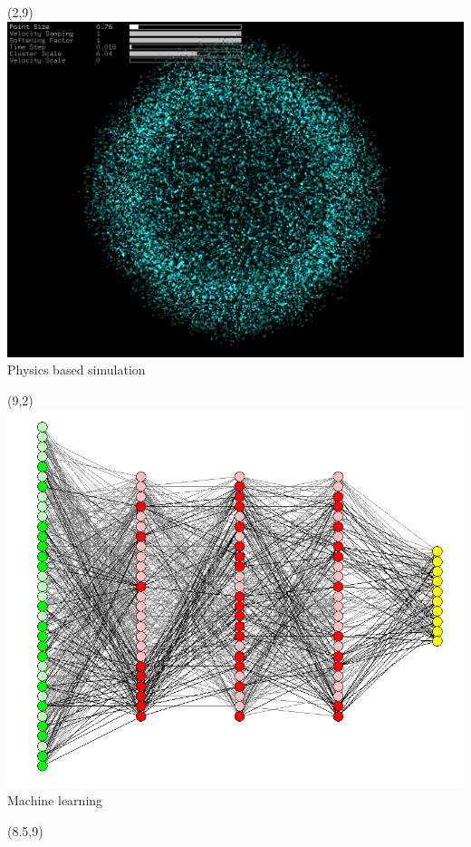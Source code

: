\documentclass{beamer}
\begin{document}
\begin{frame}
\begin{textblock}{5}(2,9)
  \centering
  \includegraphics[width=\textwidth]{graphics/opencl_nbody}
   \\
  Physics based simulation
\end{textblock}
\begin{textblock}{5}(9,2)
  \centering
\includegraphics[width=\textwidth]{graphics/neuralnet}
 \\
 \vspace{-3.5mm}
 Machine learning
\end{textblock}
\begin{textblock}{6}(8.5,9)
  \centering

\end{textblock}
\end{frame}
\end{document}
